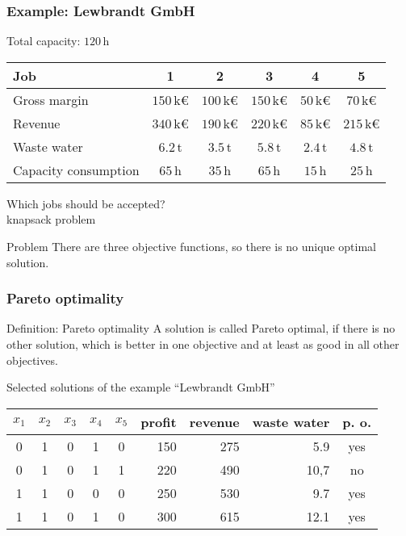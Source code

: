 \begin{frame}
 \frametitle{Example: Lewbrandt GmbH}
 Total capacity: $120\,$h\\
 \begin{center}\footnotesize
  \begin{tabular}{lccccc}
  \toprule
  \bfseries Job & \bfseries 1 & \bfseries 2 & \bfseries 3 & \bfseries 4 & \bfseries 5 \\
  \midrule
  Gross margin & $150\,$k€ & $100\,$k€ & $150\,$k€ & $50\,$k€ & $70\,$k€\\
  Revenue & $340\,$k€ & $190\,$k€ & $220\,$k€ & $85\,$k€ & $215\,$k€ \\
  Waste water & $6.2\,$t & $3.5\,$t & $5.8\,$t & $2.4\,$t & $4.8\,$t \\
  Capacity consumption &  $65\,$h & $35\,$h & $65\,$h & $15\,$h & $25\,$h\\
  \bottomrule
  \end{tabular}
 \end{center}
 
 Which jobs should be accepted? \\\textrightarrow{} knapsack problem
 
 \begin{block}{Problem}
  There are three objective functions, so there is no unique optimal solution.
 \end{block}
\end{frame}

\begin{frame}
 \frametitle{Pareto optimality}
 \begin{block}{Definition: Pareto optimality}
  A solution is called Pareto optimal, if there is no other solution, which is better in one objective and at least as good in all other objectives. 
 \end{block}
 
 \begin{block}{Selected solutions of the example "`Lewbrandt GmbH"'}
  \footnotesize
 \centering
 \begin{tabular}{*{5}{c}rrrc}
  \toprule
  $x_1$ & $x_2$ & $x_3$ & $x_4$ & $x_5$ & \scriptsize profit & \scriptsize revenue & \scriptsize waste water & p. o. \\
  \midrule
  0&	1&	0&	1&	0&	150&	275&	5.9&	yes\\
  \alert{0}&	\alert{1}&	\alert{0}&	\alert{1}&	\alert{1}&	\alert{220}&	\alert{490}&	\alert{10,7}&	\alert{no}\\
  1&	1&	0&	0&	0&	250&	530&	9.7&	yes\\
  1&	1&	0&	1&	0&	300&	615&	12.1&	yes\\
  \bottomrule
 \end{tabular}
 \end{block}

\end{frame}

